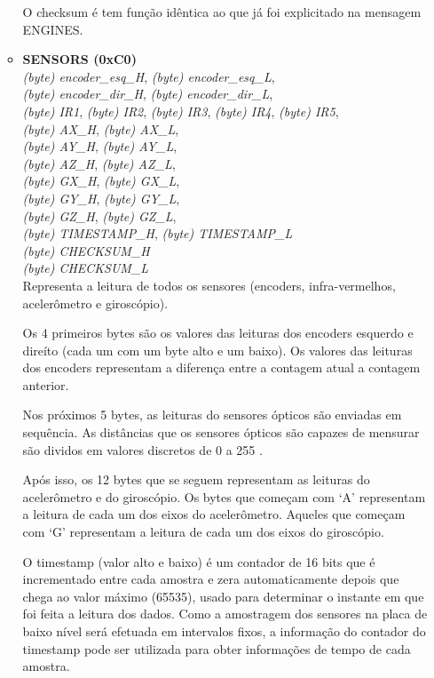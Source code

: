 \begin{itemize}
\begin{itemize}
	  O checksum é tem função idêntica ao que já foi explicitado na mensagem ENGINES.
	  
	  \item \textbf{SENSORS (0xC0)}\\
	  \textit{(byte) encoder\_esq\_H}, \textit{(byte) encoder\_esq\_L},\\
	  \textit{(byte) encoder\_dir\_H}, \textit{(byte) encoder\_dir\_L},\\
	  \textit{(byte) IR1}, \textit{(byte) IR2}, \textit{(byte) IR3}, \textit{(byte) IR4}, \textit{(byte) IR5},\\
	  \textit{(byte) AX\_H}, \textit{(byte) AX\_L},\\
	  \textit{(byte) AY\_H}, \textit{(byte) AY\_L},\\
	  \textit{(byte) AZ\_H}, \textit{(byte) AZ\_L},\\
	  \textit{(byte) GX\_H}, \textit{(byte) GX\_L},\\
	  \textit{(byte) GY\_H}, \textit{(byte) GY\_L},\\
	  \textit{(byte) GZ\_H}, \textit{(byte) GZ\_L},\\
	  \textit{(byte) TIMESTAMP\_H}, \textit{(byte) TIMESTAMP\_L}\\
	  \textit{(byte) CHECKSUM\_H}\\
	  \textit{(byte) CHECKSUM\_L}\\
	  Representa a leitura de todos os sensores (encoders, infra-vermelhos, acelerômetro e giroscópio). 
	  
	  Os 4 primeiros bytes são os valores das leituras dos encoders esquerdo e direíto (cada um com um byte alto e um baixo). Os valores das leituras dos encoders representam a diferença entre a contagem atual a contagem anterior.
	  
	  Nos próximos 5 bytes, as leituras do sensores ópticos são enviadas em sequência. As distâncias que os sensores ópticos são capazes de mensurar são dividos em valores discretos de 0 a 255 \cite{bellator_2012}. 
	  
	  Após isso, os 12 bytes que se seguem representam as leituras do acelerômetro e do giroscópio. Os bytes que começam com `A' representam a leitura de cada um dos eixos do acelerômetro. Aqueles que começam com `G' representam a leitura de cada um dos eixos do giroscópio.
	  
	  O timestamp (valor alto e baixo) é um contador de 16 bits que é incrementado entre cada amostra e zera automaticamente depois que chega ao valor máximo (65535), usado para determinar o instante em que foi feita a leitura dos dados. Como a amostragem dos sensores na placa de baixo nível será efetuada em intervalos fixos, a informação do contador do timestamp pode ser utilizada para obter informações de tempo de cada amostra.


\end{itemize}
\end{itemize}
